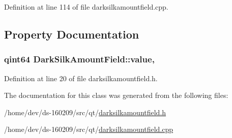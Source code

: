 Definition at line 114 of file darksilkamountfield.\+cpp.



\subsection{Property Documentation}
\hypertarget{class_dark_silk_amount_field_ae533a06697225e95bade6a9df1c6b5d2}{}
\subsubsection[{value}]{\setlength{\rightskip}{0pt plus 5cm}qint64 Dark\+Silk\+Amount\+Field\+::value\hspace{0.3cm}{\ttfamily [read]}, {\ttfamily [write]}}\label{class_dark_silk_amount_field_ae533a06697225e95bade6a9df1c6b5d2}


Definition at line 20 of file darksilkamountfield.\+h.



The documentation for this class was generated from the following files\+:\begin{DoxyCompactItemize}
\item 
/home/dev/ds-\/160209/src/qt/\hyperlink{darksilkamountfield_8h}{darksilkamountfield.\+h}\item 
/home/dev/ds-\/160209/src/qt/\hyperlink{darksilkamountfield_8cpp}{darksilkamountfield.\+cpp}\end{DoxyCompactItemize}
